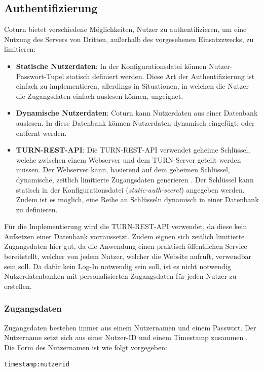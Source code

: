 \subsection{Authentifizierung}
Coturn bietet verschiedene Möglichkeiten, Nutzer zu authentifizieren, um eine Nutzung des Servers von Dritten, außerhalb des vorgesehenen Einsatzzwecks, zu limitieren:

\begin{itemize}
  \item \textbf{Statische Nutzerdaten}: In der Konfigurationsdatei können Nutzer-Passwort-Tupel statisch definiert werden. Diese Art der Authentifizierung ist einfach zu implementieren, allerdings in Situationen, in welchen die Nutzer die Zugangsdaten einfach auslesen können, ungeignet.
  \item \textbf{Dynamische Nutzerdaten}: Coturn kann Nutzerdaten aus einer Datenbank auslesen. In diese Datenbank können Nutzerdaten dynamisch eingefügt, oder entfernt werden.
  \item \textbf{TURN-REST-API}: Die TURN-REST-API verwendet geheime Schlüssel, welche zwischen einem Webserver und dem TURN-Server geteilt werden müssen. Der Webserver kann, basierend auf dem geheimen Schlüssel, dynamische, zeitlich limitierte Zugangsdaten generieren \cite{turnrestRFC}. Der Schlüssel kann statisch in der Konfigurationsdatei (\textit{static-auth-secret}) angegeben werden. Zudem ist es möglich, eine Reihe an Schlüsseln dynamisch in einer Datenbank zu definieren.
\end{itemize}

Für die Implementierung wird die TURN-REST-API verwendet, da diese kein Aufsetzen einer Datenbank vorraussetzt. Zudem eignen sich zeitlich limitierte Zugangsdaten hier gut, da die Anwendung einen praktisch öffentlichen Service bereitstellt, welcher von jedem Nutzer, welcher die Website aufruft, verwendbar sein soll. Da dafür kein Log-In notwendig sein soll, ist es nicht notwendig Nutzerdatenbanken mit personalisierten Zugangsdaten für jeden Nutzer zu erstellen.\par

\subsubsection{Zugangsdaten}
Zugangsdaten bestehen immer aus einem Nutzernamen und einem Passwort. Der Nutzername setzt sich aus einer Nutzer-ID und einem Timestamp zusammen \cite{turnrestRFC}. Die Form des Nutzernamen ist wie folgt vorgegeben:
\lstset{style=STYLE_COMMAND_LINE_ARGUMENT_SINGLE_LINE}
\begin{lstlisting}[belowskip=-0.8 \baselineskip]
timestamp:nutzerid
\end{lstlisting}

